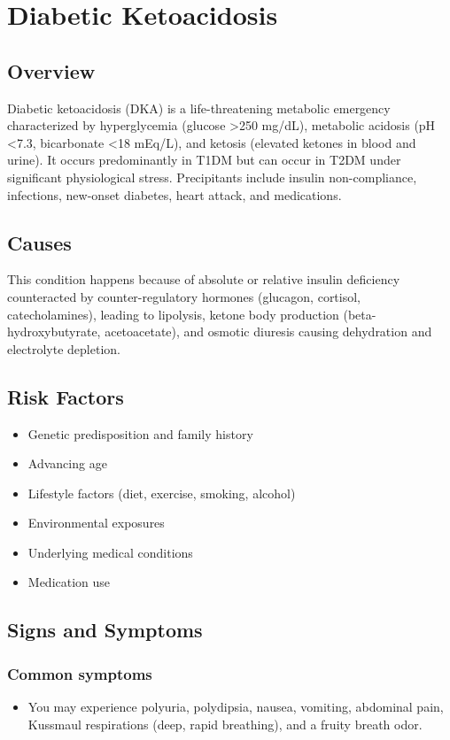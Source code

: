 \chapter{Diabetic Ketoacidosis}
\label{sec:Diabetic Ketoacidosis}

\section{Overview}
Diabetic ketoacidosis (DKA) is a life-threatening metabolic emergency characterized by hyperglycemia (glucose >250 mg/dL), metabolic acidosis (pH <7.3, bicarbonate <18 mEq/L), and ketosis (elevated ketones in blood and urine). It occurs predominantly in T1DM but can occur in T2DM under significant physiological stress. Precipitants include insulin non-compliance, infections, new-onset diabetes, heart attack, and medications.
\section{Causes}
This condition happens because of absolute or relative insulin deficiency counteracted by counter-regulatory hormones (glucagon, cortisol, catecholamines), leading to lipolysis, ketone body production (beta-hydroxybutyrate, acetoacetate), and osmotic diuresis causing dehydration and electrolyte depletion.     
\section{Risk Factors}

\begin{itemize}[noitemsep]
  \item Genetic predisposition and family history
  \item Advancing age
  \item Lifestyle factors (diet, exercise, smoking, alcohol)
  \item Environmental exposures
  \item Underlying medical conditions
  \item Medication use
\end{itemize}
\section{Signs and Symptoms}

\subsection{Common symptoms}
\begin{itemize}[noitemsep]
  \item You may experience polyuria, polydipsia, nausea, vomiting, abdominal pain, Kussmaul respirations (deep, rapid breathing), and a fruity breath odor. 
  \end{itemize}

